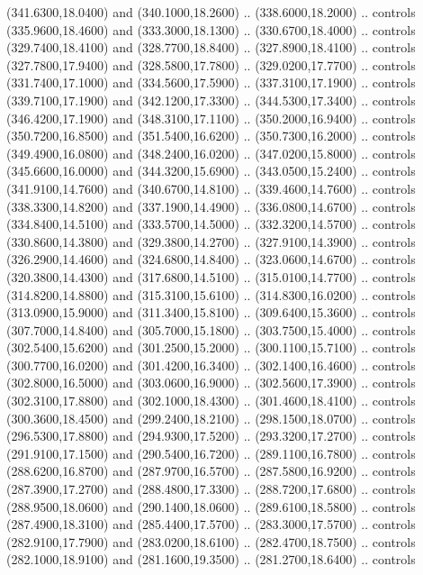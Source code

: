 {\begin{scope}[y=0.80pt, x=0.80pt, yscale=-1, xscale=1, inner sep=0pt, outer sep=0pt, #1]
      (341.6300,18.0400) and (340.1000,18.2600) .. (338.6000,18.2000) .. controls
      (335.9600,18.4600) and (333.3000,18.1300) .. (330.6700,18.4000) .. controls
      (329.7400,18.4100) and (328.7700,18.8400) .. (327.8900,18.4100) .. controls
      (327.7800,17.9400) and (328.5800,17.7800) .. (329.0200,17.7700) .. controls
      (331.7400,17.1000) and (334.5600,17.5900) .. (337.3100,17.1900) .. controls
      (339.7100,17.1900) and (342.1200,17.3300) .. (344.5300,17.3400) .. controls
      (346.4200,17.1900) and (348.3100,17.1100) .. (350.2000,16.9400) .. controls
      (350.7200,16.8500) and (351.5400,16.6200) .. (350.7300,16.2000) .. controls
      (349.4900,16.0800) and (348.2400,16.0200) .. (347.0200,15.8000) .. controls
      (345.6600,16.0000) and (344.3200,15.6900) .. (343.0500,15.2400) .. controls
      (341.9100,14.7600) and (340.6700,14.8100) .. (339.4600,14.7600) .. controls
      (338.3300,14.8200) and (337.1900,14.4900) .. (336.0800,14.6700) .. controls
      (334.8400,14.5100) and (333.5700,14.5000) .. (332.3200,14.5700) .. controls
      (330.8600,14.3800) and (329.3800,14.2700) .. (327.9100,14.3900) .. controls
      (326.2900,14.4600) and (324.6800,14.8400) .. (323.0600,14.6700) .. controls
      (320.3800,14.4300) and (317.6800,14.5100) .. (315.0100,14.7700) .. controls
      (314.8200,14.8800) and (315.3100,15.6100) .. (314.8300,16.0200) .. controls
      (313.0900,15.9000) and (311.3400,15.8100) .. (309.6400,15.3600) .. controls
      (307.7000,14.8400) and (305.7000,15.1800) .. (303.7500,15.4000) .. controls
      (302.5400,15.6200) and (301.2500,15.2000) .. (300.1100,15.7100) .. controls
      (300.7700,16.0200) and (301.4200,16.3400) .. (302.1400,16.4600) .. controls
      (302.8000,16.5000) and (303.0600,16.9000) .. (302.5600,17.3900) .. controls
      (302.3100,17.8800) and (302.1000,18.4300) .. (301.4600,18.4100) .. controls
      (300.3600,18.4500) and (299.2400,18.2100) .. (298.1500,18.0700) .. controls
      (296.5300,17.8800) and (294.9300,17.5200) .. (293.3200,17.2700) .. controls
      (291.9100,17.1500) and (290.5400,16.7200) .. (289.1100,16.7800) .. controls
      (288.6200,16.8700) and (287.9700,16.5700) .. (287.5800,16.9200) .. controls
      (287.3900,17.2700) and (288.4800,17.3300) .. (288.7200,17.6800) .. controls
      (288.9500,18.0600) and (290.1400,18.0600) .. (289.6100,18.5800) .. controls
      (287.4900,18.3100) and (285.4400,17.5700) .. (283.3000,17.5700) .. controls
      (282.9100,17.7900) and (283.0200,18.6100) .. (282.4700,18.7500) .. controls
      (282.1000,18.9100) and (281.1600,19.3500) .. (281.2700,18.6400) .. controls

\end{scope}}
